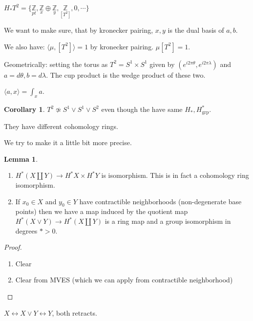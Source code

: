 \documentclass{article}
\theoremstyle{definition}
\newtheorem{lemma}[theorem]{Lemma}
\newtheorem{corollary}[theorem]{Corollary}
\begin{document}
    \(H_{\ast} T^2 = \{ \underset{p t}{\mathbb{Z}}, \underset{x}{\mathbb{Z}} \oplus \underset{y}{\mathbb{Z}}, \underset{[T^2]}{\mathbb{Z}}, 0, \cdots \} \) 

    We want to make sure, that by kronecker pairing, \(x,y\) is the dual basis of \(a,b\).

    We also have: \(\langle \mu, [T^2] \rangle = 1\) by kronecker pairing. \(\mu [T^2] = 1\).
    
    Geometrically: setting the torus as \(T^2 = S^1 \times S^1\) given by \((e^{i 2\pi \theta}, e^{i 2\pi \lambda})\) and \(a = d \theta, b = d \lambda\). The cup product is the wedge product of these two.

    \(\langle a,x \rangle = \int_x a\).

    \begin{corollary}
        \(T^2 \not\simeq S^1 \vee S^1 \vee S^2\) even though the have same \(H_{\ast}, H^{\ast}_{\text{grp}}\).

        They have different cohomology rings.
    \end{corollary}

    We try to make it a little bit more precise.
    \begin{lemma}
        \begin{enumerate}[label=\roman*)]
            \item \(H^{\ast} (X\coprod Y) \to H^{\ast} X \times H^{\ast} Y\) is isomorphism. This is in fact a cohomology ring isomorphism.
            \item If \(x_0 \in X\) and \(y_0 \in Y\) have contractible neighborhoods (non-degenerate base points) then we have a map induced by the quotient map \(H^{\ast} (X \vee Y) \to H^{\ast} (X\coprod Y)\) is a ring map and a group isomorphism in degrees \(\ast > 0\).
        \end{enumerate} 
    \end{lemma}

    \begin{proof}
        \begin{enumerate}[label=\roman*)]
            \item Clear
            \item Clear from MVES (which we can apply from contractible neighborhood) 
        \end{enumerate} 
    \end{proof}

    \(X \leftrightarrow X \vee Y \leftrightarrow Y\), both retracts.
\end{document}

